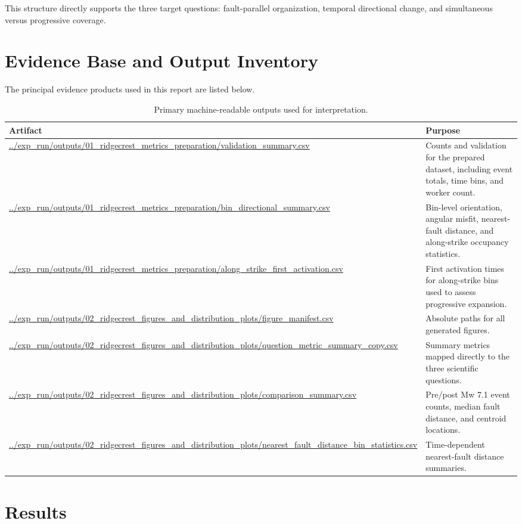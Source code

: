 \documentclass[11pt]{article}
\begin{document}
This structure directly supports the three target questions: fault-parallel organization, temporal directional change, and simultaneous versus progressive coverage.

\section{Evidence Base and Output Inventory}
The principal evidence products used in this report are listed below.

\begin{table}[H]
\centering
\caption{Primary machine-readable outputs used for interpretation.}
\begin{tabularx}{\textwidth}{>{\raggedright\arraybackslash}p{}X}
\toprule
Artifact & Purpose \\
\midrule
\url{../exp_run/outputs/01_ridgecrest_metrics_preparation/validation_summary.csv} & Counts and validation for the prepared dataset, including event totals, time bins, and worker count. \\
\url{../exp_run/outputs/01_ridgecrest_metrics_preparation/bin_directional_summary.csv} & Bin-level orientation, angular misfit, nearest-fault distance, and along-strike occupancy statistics. \\
\url{../exp_run/outputs/01_ridgecrest_metrics_preparation/along_strike_first_activation.csv} & First activation times for along-strike bins used to assess progressive expansion. \\
\url{../exp_run/outputs/02_ridgecrest_figures_and_distribution_plots/figure_manifest.csv} & Absolute paths for all generated figures. \\
\url{../exp_run/outputs/02_ridgecrest_figures_and_distribution_plots/question_metric_summary_copy.csv} & Summary metrics mapped directly to the three scientific questions. \\
\url{../exp_run/outputs/02_ridgecrest_figures_and_distribution_plots/comparison_summary.csv} & Pre/post Mw 7.1 event counts, median fault distance, and centroid locations. \\
\url{../exp_run/outputs/02_ridgecrest_figures_and_distribution_plots/nearest_fault_distance_bin_statistics.csv} & Time-dependent nearest-fault distance summaries. \\
\bottomrule
\end{tabularx}
\end{table}

\section{Results}
\end{document}
